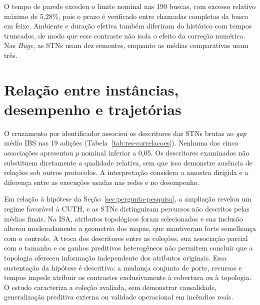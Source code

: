 O tempo de parede excedeu o limite nominal nas 190 buscas, com excesso
relativo máximo de 5,28\%, pois o prazo é verificado entre chamadas
completas da busca em feixe. Ambiente e duração efetiva também diferiram
do histórico com tempos truncados, de modo que esse contraste não isola
o efeito da correção numérica. Nas \textit{Huge}, as STNs usam dez sementes,
enquanto as médias comparativas usam três.

\section{Relação entre instâncias, desempenho e trajetórias}\label{sec:res-integracao}

O cruzamento por identificador associou os descritores das STNs brutas
ao \textit{gap} médio IBS nas 19 adições (Tabela~\ref{tab:res-correlacoes}).
Nenhuma das cinco associações apresentou $p$ nominal inferior a 0,05.
Os descritores examinados não substituem diretamente a qualidade relativa,
sem que isso demonstre ausência de relações sob outros protocolos.
A interpretação considera a amostra dirigida e a diferença entre as
execuções usadas nas redes e no desempenho.



Em relação à hipótese da Seção~\ref{sec:pergunta-pesquisa}, a ampliação
revelou um regime favorável à CUTH, e as STNs distinguiram percursos não
descritos pelas médias finais. Na ISA, atributos topológicos foram
selecionados e sua inclusão alterou moderadamente a geometria dos mapas,
que mantiveram forte semelhança com o controle. A troca dos descritores
entre as coleções, sua associação parcial com o tamanho e os ganhos
preditivos heterogêneos não permitem concluir que a topologia ofereceu
informação independente dos atributos originais. Essa sustentação da
hipótese é descritiva: a mudança conjunta de porte, recursos e tempos
impede atribuir os contrastes exclusivamente à cobertura ou à topologia.
O estudo caracteriza a coleção avaliada, sem demonstrar causalidade,
generalização preditiva externa ou validade operacional em incêndios reais.
